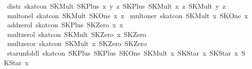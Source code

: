 \begin{isabellebody}
{}\ distr{}\ {}skat{}con\ {}SKMult\ {}SKPlus\ x\ y{}\ z{}\ {}SKPlus\ {}SKMult\ x\ z{}\ {}SKMult\ y\ z{}{}{}\isanewline
{}\ mult{}onel{}\ {}skat{}con\ {}SKMult\ SKOne\ x{}\ x{}\isanewline
{}\ mult{}oner{}\ {}skat{}con\ {}SKMult\ x\ SKOne{}\ x{}\isanewline
{}\ add{}zerol{}\ {}skat{}con\ {}SKPlus\ SKZero\ x{}\ x{}\isanewline
{}\ mult{}zerol{}\ {}skat{}con\ {}SKMult\ SKZero\ x{}\ SKZero{}\isanewline
{}\ mult{}zeror{}\ {}skat{}con\ {}SKMult\ x\ SKZero{}\ SKZero{}\isanewline
\isanewline
\ \ \isanewline
{}\ star{}unfoldl{}\ {}skat{}con\ {}SKPlus\ {}SKPlus\ SKOne\ {}SKMult\ x\ {}SKStar\ x{}{}{}\ {}SKStar\ x{}{}\ {}SKStar\ x{}{}\isanewline

\end{isabellebody}
